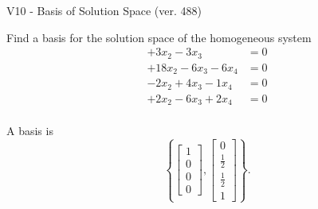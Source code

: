 \begin{exercise}
  \begin{exerciseTitle}V10 - Basis of Solution Space (ver. 488)\end{exerciseTitle}
  \begin{exerciseStatement}
    Find a basis for the solution space of the homogeneous system 
\begin{align*}
 + 3 x_ 2 -3 x_ 3 &= 0  \\ 
  + 18 x_ 2 -6 x_ 3 -6 x_ 4 &= 0  \\ 
  -2 x_ 2 + 4 x_ 3 -1 x_ 4 &= 0  \\ 
  + 2 x_ 2 -6 x_ 3 + 2 x_ 4 &= 0  \\ 
 \end{align*}


 
  \end{exerciseStatement}

  \begin{exerciseAnswer}
   A basis is   
\[\left\{\left[\begin{array}{c}
1 \\
0 \\
0 \\
0
\end{array}\right] , \left[\begin{array}{c}
0 \\
\frac{1}{2} \\
\frac{1}{2} \\
1
\end{array}\right]\right\}.\]

  


  \end{exerciseAnswer}
\end{exercise}